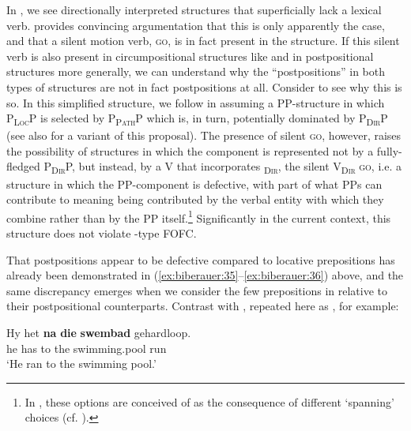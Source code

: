 \documentclass[output=paper]{LSP/langsci}
\begin{document}
In , we see directionally interpreted structures that superficially lack a lexical verb.   provides convincing argumentation that this is only apparently the case, and that a silent motion verb, \textsc{go,} is in fact present in the structure. If this silent verb is also present in  circumpositional structures like  and in  postpositional structures more generally, we can understand why the “postpositions” in both types of  structures are not in fact postpositions at all. Consider  to see why this is so. In this simplified structure, we follow \citet{denDikken2010pps,denDikken2010getgo} in assuming a PP-structure in which P\textsc{\textsubscript{Loc}}P is selected by P\textsc{\textsubscript{Path}}P which is, in turn, potentially dominated by P\textsc{\textsubscript{Dir}}P (see also \citealt{Koopman2010} for a variant of this proposal). The presence of silent \textsc{go}, however, raises the possibility of structures in which the  component is represented not by a fully-fledged P\textsc{\textsubscript{Dir}}P, but instead, by a V that incorporates \textsc{\textsubscript{Dir}}, the silent V\textsc{\textsubscript{Dir}}\textsc{ go,} i.e. a structure in which the PP-component is defective, with part of what PPs can contribute to  meaning being contributed by the verbal entity with which they combine rather than by the PP itself.\footnote{\label{fn:biberauer:39}%
In \citet{Pretorius2015}, these options are conceived of as the consequence of different ‘spanning’ choices (cf. \citealt{Svenonius2011,Svenonius2016}).} Significantly in the current context, this structure does not violate -type FOFC.

That  postpositions appear to be defective compared to locative prepositions has already been demonstrated in (\ref{ex:biberauer:35}--\ref{ex:biberauer:36}) above, and the same discrepancy emerges when we consider the few  prepositions in  relative to their postpositional counterparts. Contrast  with , repeated here as , for example:

\ea%
    \label{ex:biberauer:44}
    \ea 
\gll Hy het \textbf{na} \textbf{die} \textbf{swembad}          gehardloop.\\
    he  has to  the swimming.pool run\\
  \glt ‘He ran to the swimming pool.’
\end{document}
